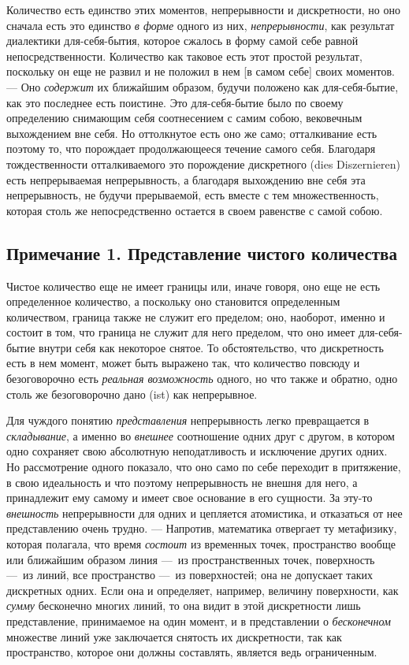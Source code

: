 Количество есть единство этих моментов, непрерывности и дискретности, но оно
сначала есть это единство {\em в форме} одного из них,
{\em непрерывности}, как результат диалектики
для-себя-бытия, которое сжалось в форму самой себе равной
непосредственности. Количество как таковое есть этот простой результат,
поскольку он еще не развил и не положил в нем [в самом себе] своих
моментов. — Оно {\em содержит} их ближайшим образом,
будучи положено как для-себя-бытие, как это последнее есть поистине. Это
для-себя-бытие было по своему определению снимающим себя соотнесением с
самим собою, вековечным выхождением вне себя. Но оттолкнутое есть оно же
само; отталкивание есть поэтому то, что порождает продолжающееся течение
самого себя. Благодаря тождественности отталкиваемого это порождение
дискретного (dies Diszernieren) есть непрерываемая непрерывность, а
благодаря выхождению вне себя эта непрерывность, не будучи прерываемой,
есть вместе с тем множественность, которая столь же непосредственно
остается в своем равенстве с самой собою.

\subsection*{Примечание 1. Представление чистого количества}

Чистое количество еще не имеет границы или, иначе говоря, оно еще не есть
определенное количество, а поскольку оно становится определенным
количеством, граница также не служит его пределом; оно, наоборот, именно и
состоит в том, что граница не служит для него пределом, что оно имеет
для-себя-бытие внутри себя как некоторое снятое. То обстоятельство, что
дискретность есть в нем момент, может быть выражено так, что количество
повсюду и безоговорочно есть {\em реальная возможность}
одного, но что также и обратно, одно столь же безоговорочно дано (ist) как
непрерывное.

Для чуждого понятию {\em представления} непрерывность
легко превращается в {\em складывание}, а именно во
{\em внешнее} соотношение одних друг с другом, в
котором одно сохраняет свою абсолютную неподатливость и исключение других
одних. Но рассмотрение одного показало, что оно само по себе переходит в
притяжение, в свою идеальность и что поэтому непрерывность не внешня для
него, а принадлежит ему самому и имеет свое основание в его сущности. За
эту-то {\em внешность} непрерывности для одних и
цепляется атомистика, и отказаться от нее представлению очень трудно. —
Напротив, математика отвергает ту метафизику, которая полагала, что время
{\em состоит} из временных точек, пространство вообще
или ближайшим образом линия —~из пространственных точек, поверхность —~из
линий, все пространство —~из поверхностей; она не допускает таких
дискретных одних. Если она и определяет, например, величину поверхности,
как {\em сумму} бесконечно многих линий, то она видит в
этой дискретности лишь представление, принимаемое на один момент, и в
представлении о {\em бесконечном} множестве линий уже
заключается снятость их дискретности, так как пространство, которое они
должны составлять, является ведь ограниченным.

